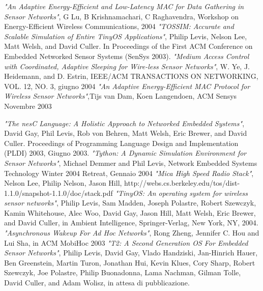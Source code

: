 \documentclass[twoside,11pt,a4paper,italian,openany]{book}
\begin{document}
\backmatter
\begin{thebibliography}{99}
 \emph{"An Adaptive Energy-Efficient and Low-Latency MAC for Data Gathering in Sensor Networks"}, G Lu, B Krishnamachari, C Raghavendra, Workshop on Energy-Efficient Wireless Communications, 2004 
\emph{"TOSSIM: Accurate and Scalable Simulation of Entire TinyOS Applications"}, Philip Levis, Nelson Lee, Matt Welsh, and David Culler. In Proceedings of the First ACM Conference on Embedded Networked Sensor Systems (SenSys 2003).  
\emph{"Medium Access Control with Coordinated, Adaptive Sleeping for Wire-less Sensor Networks"}, W. Ye, J. Heidemann, and D. Estrin, IEEE/ACM TRANSACTIONS ON NETWORKING, VOL. 12, NO. 3, giugno 2004
\emph{"An Adaptive Energy-Efficient MAC Protocol for Wireless Sensor Networks"},Tijs van Dam, Koen Langendoen,  ACM Sensys Novembre 2003

\emph{"The nesC Language: A Holistic Approach to Networked Embedded Systems"}, David Gay, Phil Levis, Rob von Behren, Matt Welsh, Eric Brewer, and David Culler. Proceedings of Programming Language Design and Implementation (PLDI) 2003, Giugno 2003.
\emph{"Tython: A Dynamic Simulation Environment for Sensor Networks"}, Michael Demmer and Phil Levis, Network Embedded Systems Technology Winter 2004 Retreat, Gennaio 2004
\emph{"Mica High Speed Radio Stack"}, Nelson Lee, Philip Nelson, Jason Hill, http://webs.cs.berkeley.edu/tos/dist-1.1.0/snapshot-1.1.0/doc/stack.pdf
\emph{"TinyOS: An operating system for wireless sensor networks"}, Philip Levis, Sam Madden, Joseph Polastre, Robert Szewczyk, Kamin Whitehouse, Alec Woo, David Gay, Jason Hill, Matt Welsh, Eric Brewer, and David Culler, in Ambient Intelligence, Springer-Verlag, New York, NY, 2004.
\emph{"Asynchronous Wakeup For Ad Hoc Networks"}, Rong Zheng, Jennifer C. Hou and Lui Sha,  in ACM MobiHoc 2003
 \emph{"T2: A Second Generation OS For Embedded Sensor Networks"}, Philip Levis, David Gay, Vlado Handziski, Jan-Hinrich Hauer, Ben Greenstein, Martin Turon, Jonathan Hui, Kevin Klues, Cory Sharp, Robert Szewczyk, Joe Polastre, Philip Buonadonna, Lama Nachman, Gilman Tolle, David Culler, and Adam Wolisz, in attesa di pubblicazione. 


\end{thebibliography}
\end{document}
